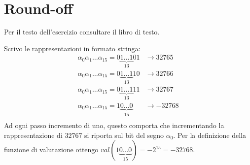 \section{Round-off}

\begin{exercise}[1.5]
Per il testo dell'esercizio consultare il libro di testo.
\end{exercise}
Scrivo le rappresentazioni in formato stringa:
\begin{displaymath}
	\begin{split}
		\alpha_{0}\alpha_{1}\ldots\alpha_{15} = 0\underbrace{1\ldots1}_{13}01 & 
			\rightarrow  32765 \\
		\alpha_{0}\alpha_{1}\ldots\alpha_{15} = 0\underbrace{1\ldots1}_{13}10 & 
			\rightarrow  32766 \\
		\alpha_{0}\alpha_{1}\ldots\alpha_{15} = 0\underbrace{1\ldots1}_{13}11 & 
			\rightarrow  32767 \\
		\alpha_{0}\alpha_{1}\ldots\alpha_{15} = 1\underbrace{0\ldots0}_{15} & 
			\rightarrow  -32768 \\
	\end{split}
\end{displaymath}
Ad ogni passo incremento di uno, questo comporta che incrementando la rappresentazione
di $32767$ si riporta sul bit del segno $\alpha_{0}$. Per la definizione della funzione di 
valutazione ottengo $val(1\underbrace{0\ldots0}_{15}) = -2^{15} = -32768$.

